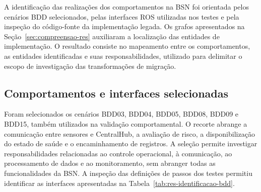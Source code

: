 A identificação das realizações dos comportamentos na BSN foi orientada pelos cenários BDD selecionados, pelas interfaces ROS utilizadas nos testes e pela inspeção do código-fonte da implementação legada. Os grafos apresentados na Seção~\ref{sec:compreensao-res} auxiliaram a localização das entidades de implementação. O resultado consiste no mapeamento entre os comportamentos, as entidades identificadas e suas responsabilidades, utilizado para delimitar o escopo de investigação das transformações de migração.


\subsection{Comportamentos e interfaces selecionadas}
\label{subsec:res-identificacao-contratos}

Foram selecionados os cenários BDD03, BDD04, BDD05, BDD08, BDD09 e BDD15, também utilizados na validação comportamental. O recorte abrange a comunicação entre sensores e CentralHub, a avaliação de risco, a disponibilização do estado de saúde e o encaminhamento de registros. A seleção permite investigar responsabilidades relacionadas ao controle operacional, à comunicação, ao processamento de dados e ao monitoramento, sem abranger todas as funcionalidades da BSN. A inspeção das definições de passos dos testes permitiu identificar as interfaces apresentadas na Tabela~\ref{tab:res-identificacao-bdd}.

